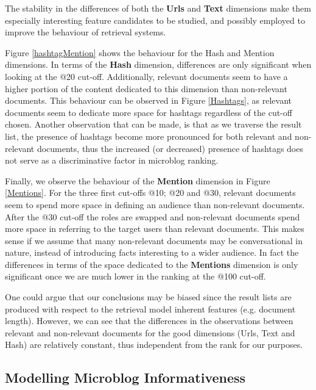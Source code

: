 The stability in the differences of both the \textbf{Urls} and \textbf{Text} dimensions make them especially interesting feature candidates to be studied, and possibly employed to improve the behaviour of retrieval systems.





Figure \ref{hashtagMention} shows the behaviour for the Hash and Mention dimensions. In terms of the \textbf{Hash} dimension, differences are only significant when looking at the @20 cut-off. Additionally, relevant documents seem to have a higher portion of the content dedicated to this dimension than non-relevant documents. This behaviour can be observed in Figure \ref{Hashtags}, as relevant documents seem to dedicate more space for hashtags regardless of the cut-off chosen. Another observation that can be made, is that as we traverse the result list, the presence of hashtags become more pronounced for both relevant and non-relevant documents, thus the increased (or decreased) presence of hashtags does not serve as a discriminative factor in microblog ranking.



Finally, we observe the behaviour of the \textbf{Mention} dimension in Figure \ref{Mentions}. For the three first cut-offs @10; @20 and @30, relevant documents seem to spend more space in defining an audience than non-relevant documents. After the @30 cut-off the roles are swapped and non-relevant documents spend more space in referring to the target users than relevant documents. This makes sense if we assume that many non-relevant documents may be conversational in nature, instead of introducing facts interesting to a wider audience. In fact the differences in terms of the space dedicated to the \textbf{Mentions} dimension is only significant once we are much lower in the ranking at the @100 cut-off.



One could argue that our conclusions may be biased since the result lists are produced with respect to the retrieval model inherent features (e.g. document length). However, we can see that the differences in the observations between relevant and non-relevant documents for the good dimensions (Urls, Text and Hash) are relatively constant, thus independent from the rank for our purposes.

\subsection{Modelling Microblog Informativeness}



